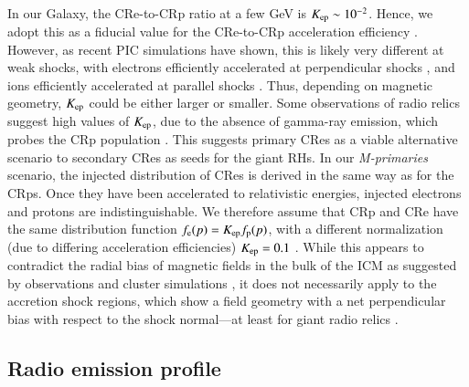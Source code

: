 \documentclass[fleqn,usenatbib,useAMS]{mnras}
\begin{document}
In our Galaxy, the CRe-to-CRp ratio at a few GeV is $K_{{\mathrm{ep}}} \sim
10^{-2}$. Hence, we adopt this as a fiducial value for the CRe-to-CRp
acceleration efficiency \citep[see][for more
  discussion]{pinzke13}. However, as recent PIC simulations have
shown, this is likely very different at weak shocks, with electrons
efficiently accelerated at perpendicular shocks
\citep{2014ApJ...794..153G,2014ApJ...797...47G}, and ions efficiently
accelerated at parallel shocks \citep{2014ApJ...783...91C}. Thus,
depending on magnetic geometry, $K_{{\mathrm{ep}}}$ could be either larger
or smaller. Some observations of radio relics suggest high values of
$K_{{\mathrm{ep}}}$, due to the absence of gamma-ray emission, which probes
the CRp population \citep{2014MNRAS.437.2291V}. This suggests primary
CRes as a viable alternative scenario to secondary CRes as seeds for
the giant RHs. In our {\em M-primaries} scenario, the injected
distribution of CRes is derived in the same way as for the CRps. Once
they have been accelerated to relativistic energies, injected
electrons and protons are indistinguishable. We therefore assume that
CRp and CRe have the same distribution function $f_{\mathrm{e}}(p) =
K_{\mathrm{ep}} f_{\mathrm{p}}(p)$, with a different normalization (due to
differing acceleration efficiencies) $K_{\mathrm{ep}}=0.1$ \citep[which is
  viable for primarily perpendicular
  shocks][]{2014ApJ...794..153G}. While this appears to contradict the
radial bias of magnetic fields in the bulk of the ICM as suggested by
observations \citep{2010NatPh...6..520P} and cluster simulations
\citep{2011ApJ...740...81R}, it does not necessarily apply to the
accretion shock regions, which show a field geometry with a net
perpendicular bias with respect to the shock normal---at least for
giant radio relics \citep{2010Sci...330..347V}.


\subsection{Radio emission profile}

\end{document}
